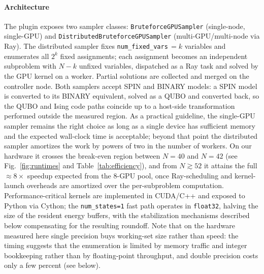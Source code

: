 \documentclass[preprint,12pt,a4paper]{elsarticle}
\begin{document}
\paragraph{Architecture}
The plugin exposes two sampler classes: \texttt{BruteforceGPUSampler}
(single-node, single-GPU) and \texttt{DistributedBruteforceGPUSampler}
(multi-GPU/multi-node via Ray). The distributed sampler fixes
\texttt{num\_fixed\_vars}\,$=k$ variables and enumerates all $2^{k}$ fixed
assignments; each assignment becomes an independent subproblem with $N-k$
unfixed variables, dispatched as a Ray task and solved by the GPU kernel on a
worker. Partial solutions are collected and merged on the controller node. Both
samplers accept SPIN and BINARY models: a SPIN model is converted to its BINARY
equivalent, solved as a QUBO and converted back, so the QUBO and Ising code
paths coincide up to a host-side transformation performed outside the measured
region. As a practical guideline, the single-GPU sampler remains the right
choice as long as a single device has sufficient memory and the expected
wall-clock time is acceptable; beyond that point the distributed sampler
amortizes the work by powers of two in the number of workers. On our hardware it
crosses the break-even region between $N=40$ and $N=42$ (see
Fig.~\ref{fig:runtimes} and Table~\ref{tab:efficiency}), and from
$N\!\gtrsim\!52$ it attains the full $\approx\!8\times$ speedup expected from
the 8-GPU pool, once Ray-scheduling and kernel-launch overheads are amortized
over the per-subproblem computation. Performance-critical kernels are
implemented in CUDA/C++ and exposed to Python via Cython; the
\texttt{num\_states=1} fast path operates in \texttt{float32}, halving the size of
the resident energy buffers, with the stabilization mechanisms described below
compensating for the resulting roundoff. Note that on the hardware measured here
single precision buys working-set size rather than speed: the timing suggests that the
enumeration is limited by memory traffic and integer bookkeeping rather than by floating-point throughput,
and double precision costs only a few percent (see below).
\end{document}
